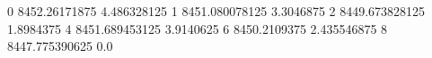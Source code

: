 0 8452.26171875 4.486328125
1 8451.080078125 3.3046875
2 8449.673828125 1.8984375
4 8451.689453125 3.9140625
6 8450.2109375 2.435546875
8 8447.775390625 0.0
